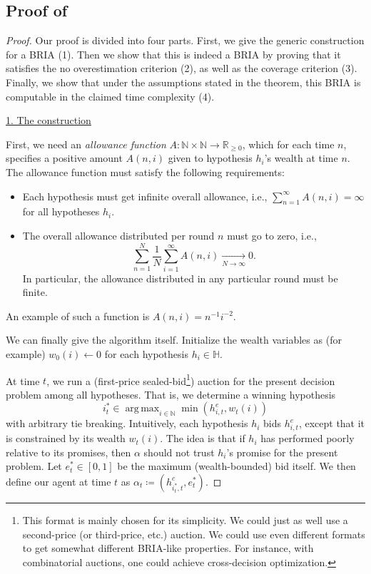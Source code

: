 \documentclass[submission,copyright,creativecommons]{eptcs}
\DeclareMathOperator*{\argmax}{arg\,max}
\begin{document}
\subsection{Proof of }
\label{appendix:computing-BRIAs}

\computingBRIAsthm*

\begin{proof}
%
%
Our proof is divided into four parts. First, we give the generic construction for a BRIA (1). Then we show that this is indeed a BRIA by proving that it satisfies the no overestimation criterion (2), as well as the coverage criterion (3). Finally, we show that under the assumptions stated in the theorem, this BRIA is computable in the claimed time complexity (4).

\underline{1. The construction}
%

First, we need an \textit{allowance function} $A:\mathbb{N}\times \mathbb{N}\rightarrow \mathbb{R}_{\geq 0}$, which for each time $n$, specifies a positive amount $A(n,i)$ given to hypothesis $h_i$'s wealth at time $n$. The allowance function must satisfy the following requirements:
\begin{itemize}
\item Each hypothesis must get infinite overall allowance, i.e.,
$\sum_{n=1}^{\infty} A(n,i)=\infty$
for all hypotheses $h_i$.
%
\item The overall allowance distributed per round $n$ must go to zero, i.e.,
\begin{equation}\label{eq:allowance-to-zero}
\sum_{n=1}^N \frac{1}{N} \sum_{i=1}^{\infty} A(n,i) \underset{N\rightarrow \infty}{\rightarrow} 0.
\end{equation}
In particular, the allowance distributed in any particular round must be finite.
\end{itemize}
An example of such a function is $A(n,i) =  n^{-1}i^{-2}$.


%

We can finally give the algorithm itself. Initialize the wealth variables as (for example) $w_0(i)\leftarrow 0$ for each hypothesis $h_i\in \mathbb{H}$.

At time $t$, we run a (first-price sealed-bid\footnote{This format is mainly chosen for its simplicity. We could just as well use a second-price (or third-price, etc.) auction. We could use even different formats to get somewhat different BRIA-like properties. For instance, with combinatorial auctions, one could achieve cross-decision optimization. %
}) auction for the present decision problem among all hypotheses. That is, we determine a winning hypothesis
\begin{equation}\label{eq:highest-hypothesis}
    i^*_t \in \argmax_{i\in \mathbb{N}} \min (h_{i,t}^e , w_t(i))
\end{equation}
with arbitrary tie breaking. Intuitively, each hypothesis $h_i$ bids $h_{i,t}^e$, except that it is constrained by its wealth $w_t(i)$. The idea is that if $h_i$ has performed poorly relative to its promises, then $\alpha$ should not trust $h_i$'s promise for the present problem.
Let $e^*_t\in[0,1]$ be the maximum (wealth-bounded) bid itself. We then define our agent at time $t$ as $\alpha_t \coloneqq (h_{i_t^*,t}^c , e^*_t)$.


\end{proof}
\end{document}
